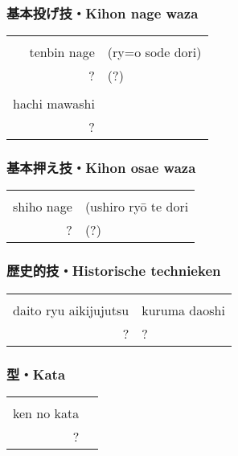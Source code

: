 \subsubsection{基本投げ技・Kihon nage waza}
\begin{table}[H]
\begin{center}
\begin{tabular}{rl}
    \ruby{}{}\ruby{}{} & \\
    tenbin nage & (ry={o} sode dori)\\
    ? & (?)\\
    \hline
    \ruby{}{} &\\
    hachi mawashi &\\
    ? &
\end{tabular}
\end{center}
\label{kyuu_2_kihon_nage_waza}
\end{table}

\subsubsection{基本押え技・Kihon osae waza}
\begin{table}[H]
\begin{center}
\begin{tabular}{rl}
    \ruby{}{}\ruby{}{} & \\
    shiho nage & (ushiro ry\={o} te dori})\\
    ? & (?)
\end{tabular}
\end{center}
\label{kyuu_2_kihon_osae_waza}
\end{table}

\subsubsection{歴史的技・Historische technieken}
\begin{table}[H]
\begin{center}
\begin{tabular}{rl}
    \ruby{}{}\ruby{}{} & \\
    daito ryu aikijujutsu & kuruma daoshi\\
    ? & ?
\end{tabular}
\end{center}
\label{kyuu_2_historic}
\end{table}

\subsubsection{型・Kata}
\begin{table}[H]
\begin{center}
\begin{tabular}{rl}
    \ruby{}{}\ruby{}{}\\
    ken no kata\\
    ?
\end{tabular}
\end{center}
\label{kyuu_2_kata}
\end{table}

